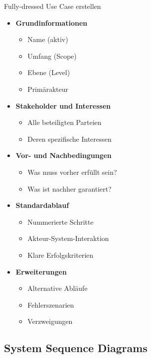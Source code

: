 \begin{KR}{Fully-dressed Use Case erstellen}
\begin{itemize}
    \item \textbf{Grundinformationen}
    \begin{itemize}
        \item Name (aktiv)
        \item Umfang (Scope)
        \item Ebene (Level)
        \item Primärakteur
    \end{itemize}
    \item \textbf{Stakeholder und Interessen}
    \begin{itemize}
        \item Alle beteiligten Parteien
        \item Deren spezifische Interessen
    \end{itemize}
    \item \textbf{Vor- und Nachbedingungen}
    \begin{itemize}
        \item Was muss vorher erfüllt sein?
        \item Was ist nachher garantiert?
    \end{itemize}
    \item \textbf{Standardablauf}
    \begin{itemize}
        \item Nummerierte Schritte
        \item Akteur-System-Interaktion
        \item Klare Erfolgskriterien
    \end{itemize}
    \item \textbf{Erweiterungen}
    \begin{itemize}
        \item Alternative Abläufe
        \item Fehlerszenarien
        \item Verzweigungen
    \end{itemize}
\end{itemize}
\end{KR}


\subsection{System Sequence Diagrams}

